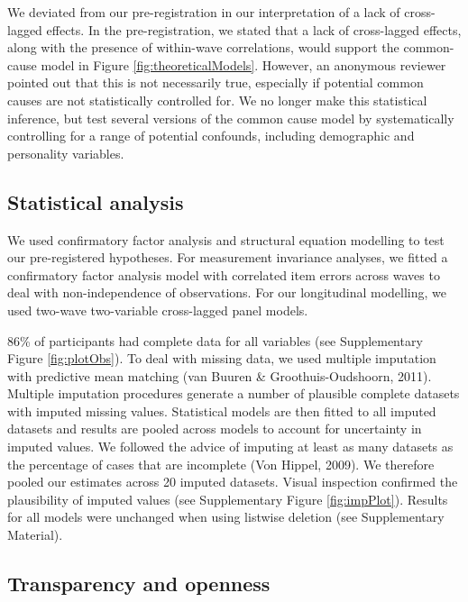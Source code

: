 \documentclass[
  man,floatsintext]{apa6}
\begin{document}
We deviated from our pre-registration in our interpretation of a lack of
cross-lagged effects. In the pre-registration, we stated that a lack of
cross-lagged effects, along with the presence of within-wave correlations, would
support the common-cause model in Figure \ref{fig:theoreticalModels}. However,
an anonymous reviewer pointed out that this is not necessarily true, especially
if potential common causes are not statistically controlled for. We no longer
make this statistical inference, but test several versions of the common cause
model by systematically controlling for a range of potential confounds,
including demographic and personality variables.

\hypertarget{statistical-analysis}{%
\subsection{Statistical analysis}\label{statistical-analysis}}

We used confirmatory factor analysis and structural equation modelling to test
our pre-registered hypotheses. For measurement invariance analyses, we fitted a
confirmatory factor analysis model with correlated item errors across waves to
deal with non-independence of observations. For our longitudinal modelling, we
used two-wave two-variable cross-lagged panel models.

86\% of participants had complete data
for all variables (see Supplementary Figure \ref{fig:plotObs}). To deal with
missing data, we used multiple imputation with predictive mean matching
(van Buuren \& Groothuis-Oudshoorn, 2011). Multiple imputation procedures generate a number of plausible
complete datasets with imputed missing values. Statistical models are then
fitted to all imputed datasets and results are pooled across models to account
for uncertainty in imputed values. We followed the advice of imputing at least
as many datasets as the percentage of cases that are incomplete
(Von Hippel, 2009). We therefore pooled our estimates across 20 imputed datasets.
Visual inspection confirmed the plausibility of imputed values (see
Supplementary Figure \ref{fig:impPlot}). Results for all models were
unchanged when using listwise deletion (see Supplementary Material).

\hypertarget{transparency-and-openness}{%
\subsection{Transparency and openness}\label{transparency-and-openness}}
\end{document}
